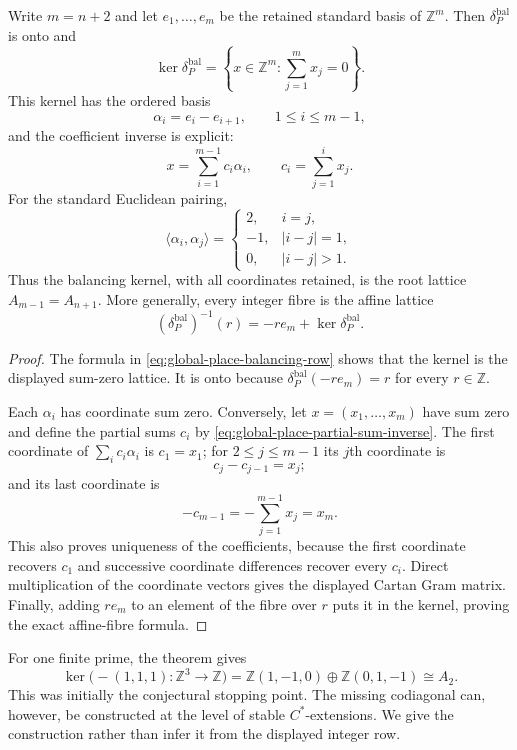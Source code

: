 \begin{theorem}
\label{thm:global-place-balancing-lattice}
Write $m=n+2$ and let $e_1,\ldots,e_m$ be the retained standard basis of
$\mathbb Z^m$.  Then $\delta_P^{\mathrm{bal}}$ is onto and
\[
 \ker\delta_P^{\mathrm{bal}}
 =\left\{x\in\mathbb Z^m:\sum_{j=1}^{m}x_j=0\right\}.
\]
This kernel has the ordered basis
\[
 \alpha_i=e_i-e_{i+1},\qquad 1\leq i\leq m-1,
\]
and the coefficient inverse is explicit:
\begin{equation}
 x=\sum_{i=1}^{m-1}c_i\alpha_i,
 \qquad
 c_i=\sum_{j=1}^{i}x_j.
 \label{eq:global-place-partial-sum-inverse}
\end{equation}
For the standard Euclidean pairing,
\[
 \langle\alpha_i,\alpha_j\rangle
 =\begin{cases}
 2,&i=j,\\
 -1,&|i-j|=1,\\
 0,&|i-j|>1.
 \end{cases}
\]
Thus the balancing kernel, with all coordinates retained, is the root lattice
$A_{m-1}=A_{n+1}$.  More generally, every integer fibre is the affine lattice
\[
 (\delta_P^{\mathrm{bal}})^{-1}(r)
 =-r e_m+\ker\delta_P^{\mathrm{bal}}.
\]
\end{theorem}

\begin{proof}
The formula in \eqref{eq:global-place-balancing-row} shows that the kernel is
the displayed sum-zero lattice.  It is onto because
$\delta_P^{\mathrm{bal}}(-r e_m)=r$ for every $r\in\mathbb Z$.

Each $\alpha_i$ has coordinate sum zero.  Conversely, let
$x=(x_1,\ldots,x_m)$ have sum zero and define the partial sums $c_i$ by
\eqref{eq:global-place-partial-sum-inverse}.  The first coordinate of
$\sum_i c_i\alpha_i$ is $c_1=x_1$; for $2\leq j\leq m-1$ its $j$th coordinate
is
\[
 c_j-c_{j-1}=x_j;
\]
and its last coordinate is
\[
 -c_{m-1}=-\sum_{j=1}^{m-1}x_j=x_m.
\]
This also proves uniqueness of the coefficients, because the first coordinate
recovers $c_1$ and successive coordinate differences recover every $c_i$.
Direct multiplication of the coordinate vectors gives the displayed Cartan
Gram matrix.  Finally, adding $r e_m$ to an element of the fibre over $r$
puts it in the kernel, proving the exact affine-fibre formula.
\end{proof}

For one finite prime, the theorem gives
\[
 \ker\bigl(-(1,1,1):\mathbb Z^3\to\mathbb Z\bigr)
 =\mathbb Z(1,-1,0)\oplus\mathbb Z(0,1,-1)\cong A_2.
\]
This was initially the conjectural stopping point.  The missing codiagonal can,
however, be constructed at the level of stable $C^*$-extensions.  We give the
construction rather than infer it from the displayed integer row.

